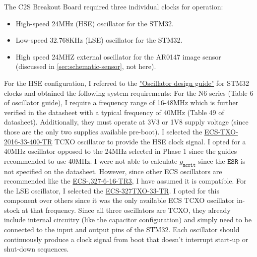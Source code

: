 The C2S Breakout Board required three individual clocks for operation:
\begin{itemize}[noitemsep]
    \item High-speed 24MHz (HSE) oscillator for the STM32.
    \item Low-speed 32.768KHz (LSE) oscillator for the STM32.
    \item High speed 24MHZ external oscillator for the AR0147 image sensor (discussed in \autoref{sec:schematic-sensor}, not here).
\end{itemize}
For the HSE configuration, I referred to the \href{https://www.st.com/resource/en/application_note/an2867-guidelines-for-oscillator-design-on-stm8afals-and-stm32-mcusmpus-stmicroelectronics.pdf}{"Oscillator design guide"} for STM32 clocks and obtained the following system requirements:
For the N6 series (Table 6 of oscillator guide), I require a frequency range of 16-48MHz which is further verified in the datasheet with a typical frequency of 40MHz (Table 49 of datasheet). Additionally, they must operate at 3V3 or 1V8 supply voltage (since those are the only two supplies available pre-boot).
\nl
I selected the \href{https://au.mouser.com/ProductDetail/ECS/ECS-TXO-2016-33-400-TR?qs=PzGy0jfpSMtctR53CPxRHg%3D%3D}{ECS-TXO-2016-33-400-TR} TCXO oscillator to provide the HSE clock signal. I opted for a 40MHz oscillator opposed to the 24MHz selected in Phase 1 since the guides recommended to use 40MHz.
I were not able to calculate $g_{\texttt{mcrit}}$ since the $\texttt{ESR}$ is not specified on the datasheet. However, since other ECS oscillators are recommended like the \href{https://au.mouser.com/datasheet/2/122/ECX_16-845175.pdf}{ECS-.327-6-16-TR3}, I have assumed it is compatible.
For the LSE oscillator, I selected the \href{https://au.mouser.com/datasheet/2/122/ECS_327TXO-1595920.pdf}{ECS-327TXO-33-TR}. I opted for this component over others since it was the only available ECS TCXO oscillator in-stock at that frequency.
\nl
Since all three oscillators are TCXO, they already include internal circuitry (like the capacitor configuration) and simply need to be connected to the input and output pins of the STM32.
\nl
Each oscillator should continuously produce a clock signal from boot that doesn't interrupt start-up or shut-down sequences.
